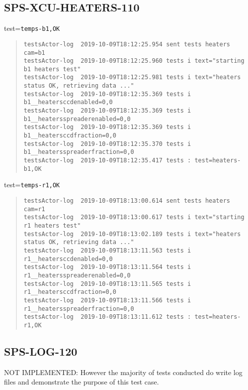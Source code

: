 \subsection{SPS-XCU-HEATERS-110}
\label{sec:tc-110}

test=\texttt{temps-b1,OK}

\begin{quote}
\begin{tiny}
\begin{verbatim}
testsActor-log  2019-10-09T18:12:25.954 sent tests heaters cam=b1
testsActor-log  2019-10-09T18:12:25.960 tests i text="starting b1 heaters test"
testsActor-log  2019-10-09T18:12:25.981 tests i text="heaters status OK, retrieving data ..."
testsActor-log  2019-10-09T18:12:35.369 tests i b1__heatersccdenabled=0,0
testsActor-log  2019-10-09T18:12:35.369 tests i b1__heatersspreaderenabled=0,0
testsActor-log  2019-10-09T18:12:35.369 tests i b1__heatersccdfraction=0,0
testsActor-log  2019-10-09T18:12:35.370 tests i b1__heatersspreaderfraction=0,0
testsActor-log  2019-10-09T18:12:35.417 tests : test=heaters-b1,OK
\end{verbatim}
\end{tiny}
\end{quote}

\noindent test=\texttt{temps-r1,OK}

\begin{quote}
\begin{tiny}
\begin{verbatim}
testsActor-log  2019-10-09T18:13:00.614 sent tests heaters cam=r1
testsActor-log  2019-10-09T18:13:00.617 tests i text="starting r1 heaters test"
testsActor-log  2019-10-09T18:13:02.189 tests i text="heaters status OK, retrieving data ..."
testsActor-log  2019-10-09T18:13:11.563 tests i r1__heatersccdenabled=0,0
testsActor-log  2019-10-09T18:13:11.564 tests i r1__heatersspreaderenabled=0,0
testsActor-log  2019-10-09T18:13:11.565 tests i r1__heatersccdfraction=0,0
testsActor-log  2019-10-09T18:13:11.566 tests i r1__heatersspreaderfraction=0,0
testsActor-log  2019-10-09T18:13:11.612 tests : test=heaters-r1,OK
\end{verbatim}
\end{tiny}
\end{quote}

\subsection{SPS-LOG-120}
\label{sec:tc-120}
NOT IMPLEMENTED: However the majority of tests conducted do write log files and demonstrate the purpose
of this test case. 


